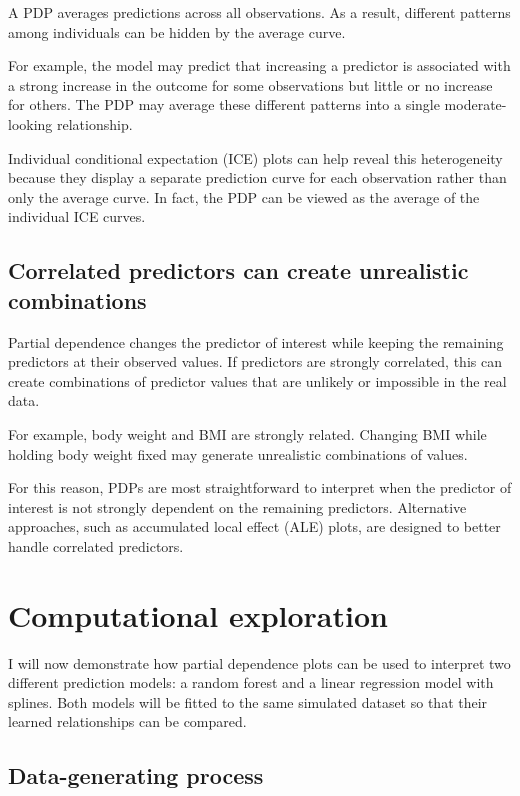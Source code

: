 \documentclass[
  letterpaper,
  DIV=11,
  numbers=noendperiod]{scrreprt}
\begin{document}
A PDP averages predictions across all observations. As a result,
different patterns among individuals can be hidden by the average curve.

For example, the model may predict that increasing a predictor is
associated with a strong increase in the outcome for some observations
but little or no increase for others. The PDP may average these
different patterns into a single moderate-looking relationship.

Individual conditional expectation (ICE) plots can help reveal this
heterogeneity because they display a separate prediction curve for each
observation rather than only the average curve. In fact, the PDP can be
viewed as the average of the individual ICE curves.

\subsection{Correlated predictors can create unrealistic
combinations}\label{correlated-predictors-can-create-unrealistic-combinations}

Partial dependence changes the predictor of interest while keeping the
remaining predictors at their observed values. If predictors are
strongly correlated, this can create combinations of predictor values
that are unlikely or impossible in the real data.

For example, body weight and BMI are strongly related. Changing BMI
while holding body weight fixed may generate unrealistic combinations of
values.

For this reason, PDPs are most straightforward to interpret when the
predictor of interest is not strongly dependent on the remaining
predictors. Alternative approaches, such as accumulated local effect
(ALE) plots, are designed to better handle correlated predictors.

\section{Computational exploration}\label{computational-exploration-2}

I will now demonstrate how partial dependence plots can be used to
interpret two different prediction models: a random forest and a linear
regression model with splines. Both models will be fitted to the same
simulated dataset so that their learned relationships can be compared.

\subsection{Data-generating process}\label{data-generating-process}
\end{document}
